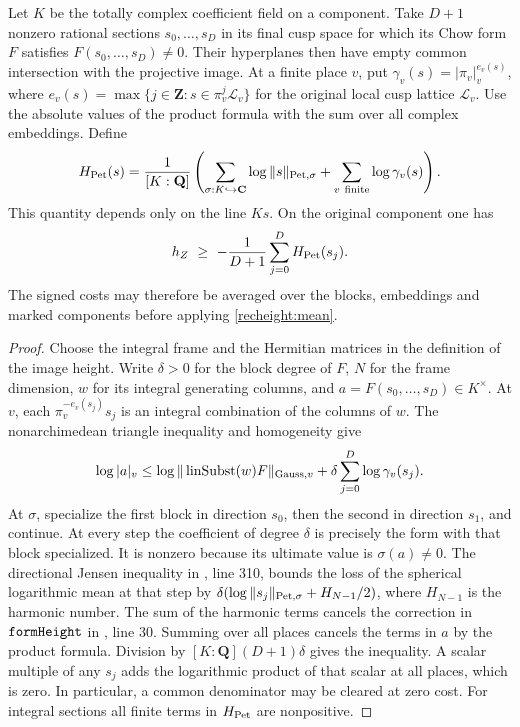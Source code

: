 \begin{proposition}\label{recheight:chow}
Let \(K\) be the totally complex coefficient field on a component.
Take \(D+1\) nonzero rational sections \(s_0,\ldots,s_D\) in its
final cusp space for which its Chow form \(F\) satisfies
\(F(s_0,\ldots,s_D)\ne0\). Their hyperplanes then have empty common
intersection with the projective image. At a finite place \(v\), put
\(\gamma_v(s)=|\pi_v|_v^{e_v(s)}\), where
\(e_v(s)=\max\{j\in\mathbf Z:s\in\pi_v^j\mathcal L_v\}\) for the
original local cusp lattice \(\mathcal L_v\). Use the absolute values
of the product formula with the sum over all complex embeddings.
Define
\[
 H_{\rm Pet}(s)=\frac{1}{[K:\mathbf Q]}
   \left(\sum_{\sigma:K\hookrightarrow\mathbf C}
           \log\|s\|_{{\rm Pet},\sigma}
         +\sum_{v\ {\rm finite}}\log\gamma_v(s)\right).
\]
This quantity depends only on the line \(Ks\). On the original
component one has
\[
        h_Z\ \ge\ -\frac{1}{D+1}\sum_{j=0}^D H_{\rm Pet}(s_j).
\]
The signed costs may therefore be averaged over the blocks,
embeddings and marked components before applying
\eqref{recheight:mean}.
\end{proposition}
\begin{proof}
Choose the integral frame and the Hermitian matrices in the
definition of the image height. Write \(\delta>0\) for the block
degree of \(F\), \(N\) for the frame dimension, \(w\) for its
integral generating columns, and \(a=F(s_0,\ldots,s_D)\in K^\times\).
At \(v\), each \(\pi_v^{-e_v(s_j)}s_j\) is an integral combination
of the columns of \(w\). The nonarchimedean triangle inequality
and homogeneity give
\[
 \log|a|_v\le
     \log\|\operatorname{linSubst}(w)F\|_{{\rm Gauss},v}
      +\delta\sum_{j=0}^D\log\gamma_v(s_j).
\]
At \(\sigma\), specialize the first block in direction \(s_0\),
then the second in direction \(s_1\), and continue. At every step
the coefficient of degree \(\delta\) is precisely the form with that
block specialized. It is nonzero because its ultimate value is
\(\sigma(a)\ne0\). The directional Jensen inequality
 in
, line 310, bounds the loss of
the spherical logarithmic mean at that step by
\(\delta(\log\|s_j\|_{{\rm Pet},\sigma}+H_{N-1}/2)\), where
\(H_{N-1}\) is the harmonic number. The sum of the harmonic terms
cancels the correction in \(\texttt{formHeight}\) in
, line 30. Summing over all places cancels
the terms in \(a\) by the product formula. Division by
\([K:\mathbf Q](D+1)\delta\) gives the inequality. A scalar
multiple of any \(s_j\) adds the logarithmic product of that scalar
at all places, which is zero. In particular, a common denominator
may be cleared at zero cost. For integral sections all finite
terms in \(H_{\rm Pet}\) are nonpositive.
\end{proof}

